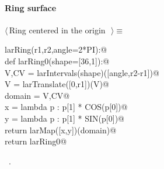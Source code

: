 \documentclass[11pt,oneside]{article}	%
\begin{document}
\paragraph{Ring surface}
\begin{flushleft} \small \label{scrap10}
$\langle\,$Ring centered in the origin\nobreak\ {\footnotesize {}}$\,\rangle\equiv$
\vspace{-1ex}
\begin{list}{}{} \item
\mbox{}\verb@def larRing(r1,r2,angle=2*PI):@\\
\mbox{}\verb@   def larRing0(shape=[36,1]):@\\
\mbox{}\verb@      V,CV = larIntervals(shape)([angle,r2-r1])@\\
\mbox{}\verb@      V = larTranslate([0,r1])(V)@\\
\mbox{}\verb@      domain = V,CV@\\
\mbox{}\verb@      x = lambda p : p[1] * COS(p[0])@\\
\mbox{}\verb@      y = lambda p : p[1] * SIN(p[0])@\\
\mbox{}\verb@      return larMap([x,y])(domain)@\\
\mbox{}\verb@   return larRing0@\\
\mbox{}\verb@@{\NWsep}
\end{list}
\vspace{-1ex}
\footnotesize\addtolength{\baselineskip}{-1ex}
\begin{list}{}{\setlength{\itemsep}{-\parsep}\setlength{\itemindent}{-\leftmargin}}
\item \NWtxtMacroRefIn\ .
\end{list}
\end{flushleft}
\end{document}

